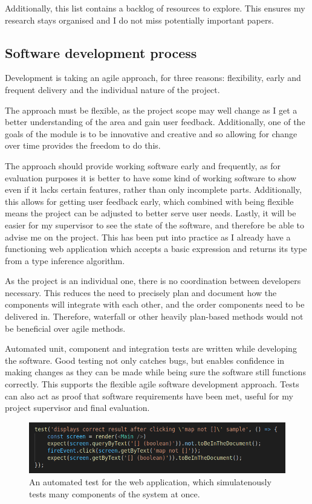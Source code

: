 \documentclass[a4paper,fleqn,12pt]{article}
\begin{document}
Additionally, this list contains a backlog of resources to explore. This ensures my research stays organised and I do not miss potentially important papers.

\subsection{Software development process}\label{id:h.d99ru3rx4zo}

Development is taking an agile approach, for three reasons: flexibility, early and frequent delivery and the individual nature of the project.

The approach must be flexible, as the project scope may well change as I get a better understanding of the area and gain user feedback. Additionally, one of the goals of the module is to be innovative and creative and so allowing for change over time provides the freedom to do this.

The approach should provide working software early and frequently, as for evaluation purposes it is better to have some kind of working software to show even if it lacks certain features, rather than only incomplete parts. Additionally, this allows for getting user feedback early, which combined with being flexible means the project can be adjusted to better serve user needs. Lastly, it will be easier for my supervisor to see the state of the software, and therefore be able to advise me on the project. This has been put into practice as I already have a functioning web application which accepts a basic expression and returns its type from a type inference algorithm.

As the project is an individual one, there is no coordination between developers necessary. This reduces the need to precisely plan and document how the components will integrate with each other, and the order components need to be delivered in. Therefore, waterfall or other heavily plan-based methods would not be beneficial over agile methods.

Automated unit, component and integration tests are written while developing the software. Good testing not only catches bugs, but enables confidence in making changes as they can be made while being sure the software still functions correctly. This supports the flexible agile software development approach. Tests can also act as proof that software requirements have been met, useful for my project supervisor and final evaluation.

\begin{figure}[h!]
  \centering
  \includegraphics[width=1.000\linewidth]{images/image3.png}
  \caption{An automated test for the web application, which simulatenously tests many components of the system at once.}
\end{figure}
\end{document}
